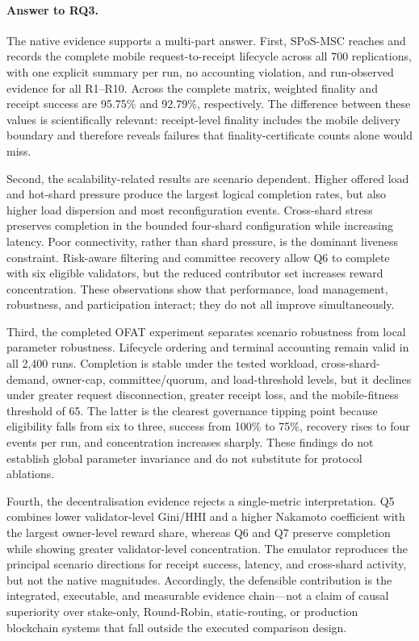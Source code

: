 \documentclass[a4paper,fleqn]{cas-sc}
\begin{document}
\paragraph{Answer to RQ3.}
The native evidence supports a multi-part answer. First, SPoS-MSC reaches and
records the complete mobile request-to-receipt lifecycle across all 700
replications, with one explicit summary per run, no accounting
violation, and run-observed evidence for all R1--R10. Across the complete
matrix, weighted finality and receipt success are 95.75\% and 92.79\%,
respectively. The difference between these values is scientifically relevant:
receipt-level finality includes the mobile delivery boundary and therefore
reveals failures that finality-certificate counts alone would miss.

Second, the scalability-related results are scenario dependent. Higher offered
load and hot-shard pressure produce the largest logical completion rates, but
also higher load dispersion and most reconfiguration events. Cross-shard stress
preserves completion in the bounded four-shard configuration while increasing
latency. Poor connectivity, rather than shard pressure, is the dominant liveness
constraint. Risk-aware filtering and committee recovery allow Q6 to complete
with six eligible validators, but the reduced contributor set increases reward
concentration. These observations show that performance, load management,
robustness, and participation interact; they do not all improve simultaneously.

Third, the completed OFAT experiment separates scenario robustness from local
parameter robustness. Lifecycle ordering and terminal accounting remain valid
in all 2,400 runs. Completion is stable under the tested workload,
cross-shard-demand, owner-cap, committee/quorum, and load-threshold levels, but
it declines under greater request disconnection, greater receipt loss, and the
mobile-fitness threshold of 65. The latter is the clearest governance tipping
point because eligibility falls from six to three, success from 100\% to
75\%, recovery rises to four events per run, and concentration increases
sharply. These findings do not establish global parameter invariance and do not
substitute for protocol ablations.

Fourth, the decentralisation evidence rejects a single-metric interpretation.
Q5 combines lower validator-level Gini/HHI and a higher Nakamoto coefficient
with the largest owner-level reward share, whereas Q6 and Q7 preserve completion
while showing greater validator-level concentration. The emulator reproduces
the principal scenario directions for receipt success, latency, and cross-shard
activity, but not the native magnitudes. Accordingly, the defensible
contribution is the integrated, executable, and measurable evidence chain—not a
claim of causal superiority over stake-only, Round-Robin, static-routing, or
production blockchain systems that fall outside the executed comparison design.
\end{document}
